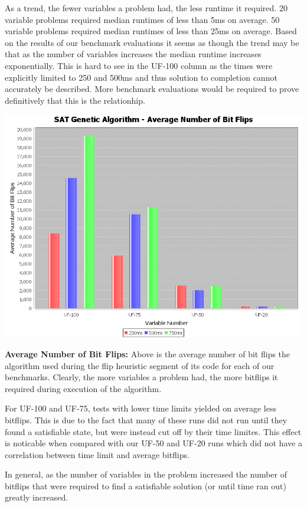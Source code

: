 \documentclass[10pt,a4paper]{article}
\begin{document}
	As a trend, the fewer variables a problem had, the less runtime it required. 20 variable problems required median runtimes of less than 5ms on average. 50 variable problems required median runtimes of less than 25ms on average. Based on the results of our benchmark evaluations it seems as though the trend may be that as the number of variables increases the median runtime increases exponentially. This is hard to see in the UF-100 column as the times were explicitly limited to 250 and 500ms and thus solution to completion cannot accurately be described. More benchmark evaluations would be required to prove definitively that this is the relationhip.
	
	\begin{center}
		\includegraphics[scale=0.35]{average_bitflips}
	\end{center}
	
	\textbf{Average Number of Bit Flips:} Above is the average number of bit flips the algorithm used during the flip heuristic segment of its code for each of our benchmarks. Clearly, the more variables a problem had, the more bitflips it required during execution of the algorithm. 
	
	For UF-100 and UF-75, tests with lower time limits yielded on average less bitflips. This is due to the fact that many of these runs did not run until they found a satisfiable state, but were instead cut off by their time limites. This effect is noticable when compared with our UF-50 and UF-20 runs which did not have a correlation between time limit and average bitflips. 
	
	In general, as the number of variables in the problem increased the number of bitflips that were required to find a satisfiable solution (or until time ran out) greatly increased.
	
\end{document}
